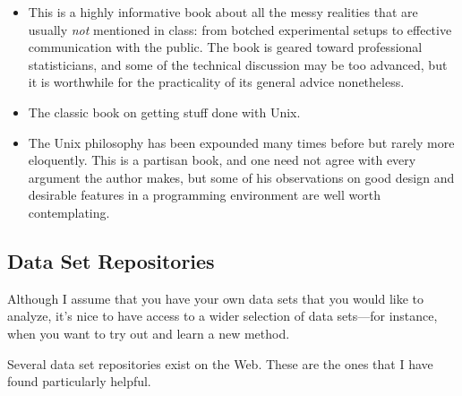 \begin{itemize}
\item {}
  This is a highly informative book about all the messy realities that
  are usually \emph{not} mentioned in class: from botched experimental
  setups to effective communication with the public. The book is
  geared toward professional statisticians, and some of the technical
  discussion may be too advanced, but it is worthwhile for the
  practicality of its general advice nonetheless.

\item {}
  The classic book on getting stuff done with Unix.

\item {}
  The Unix philosophy has been expounded many times before but rarely
  more eloquently. This is a partisan book, and one need not agree
  with every argument the author makes, but some of his observations
  on good design and desirable features in a programming environment
  are well worth contemplating.
\end{itemize}

\subsection{Data Set Repositories}

Although I assume that you have your own data sets that you would like
to analyze, it's nice to have access to a wider selection of data
sets---for instance, when you want to try out and learn a new method.

Several data set repositories exist on the Web. These are the ones
that I have found particularly helpful.


